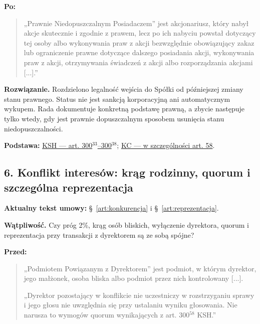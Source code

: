 \documentclass[12pt,a4paper]{report}
\begin{document}
\textbf{Po:}
\begin{quote}\small
„Prawnie Niedopuszczalnym Posiadaczem” jest akcjonariusz, który nabył akcje skutecznie i zgodnie z prawem, lecz po ich nabyciu powstał dotyczący tej osoby albo wykonywania praw z akcji bezwzględnie obowiązujący zakaz lub ograniczenie prawne dotyczące dalszego posiadania akcji, wykonywania praw z akcji, otrzymywania świadczeń z akcji albo rozporządzania akcjami [...].”
\end{quote}

\textbf{Rozwiązanie.} Rozdzielono legalność wejścia do Spółki od późniejszej zmiany stanu prawnego. Status nie jest sankcją korporacyjną ani automatycznym wykupem. Rada dokumentuje konkretną podstawę prawną, a zbycie następuje tylko wtedy, gdy jest prawnie dopuszczalnym sposobem usunięcia stanu niedopuszczalności.

\textbf{Podstawa:} \href{https://eli.gov.pl/api/acts/DU/2024/18/text.html}{KSH --- art. 300$^{33}$--300$^{38}$}; \href{https://eli.gov.pl/eli/DU/2026/795/ogl}{KC --- w szczególności art. 58}.

\subsection*{6. Konflikt interesów: krąg rodzinny, quorum i szczególna reprezentacja}
\textbf{Aktualny tekst umowy:} §~\ref{art:konkurencja} i §~\ref{art:reprezentacja}.

\textbf{Wątpliwość.} Czy próg 2\%, krąg osób bliskich, wyłączenie dyrektora, quorum i reprezentacja przy transakcji z dyrektorem są ze sobą spójne?

\textbf{Przed:}
\begin{quote}\small
„Podmiotem Powiązanym z Dyrektorem” jest podmiot, w którym dyrektor, jego małżonek, osoba bliska albo podmiot przez nich kontrolowany [...].

„Dyrektor pozostający w konflikcie nie uczestniczy w rozstrzyganiu sprawy i jego głosu nie uwzględnia się przy ustalaniu wyniku głosowania. Nie narusza to wymogów quorum wynikających z art. 300$^{58}$ KSH.”
\end{quote}
\end{document}
